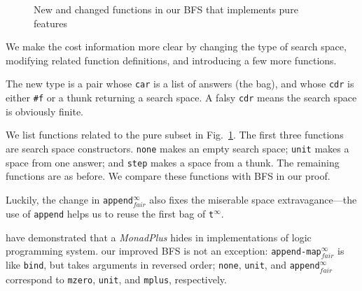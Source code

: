 \documentclass[format=acmlarge, review=true, authordraft=true]{acmart}
\newcommand{\BFS}[0]{BFS}
\newcommand{\BFSser}[0]{BFS}
\newcommand{\BFSimp}[0]{our improved BFS}
\begin{document}
\begin{figure}
		
	\caption{New and changed functions in our BFS that implements pure 
	features}
	\label{BFSimp}
\end{figure}


We make the cost information more clear by changing the type of search space, 
modifying related function definitions, and introducing a few more functions.

The new type is a pair whose \texttt{car} is a list of answers (the bag), and 
whose \texttt{cdr} is either \texttt{\#{}f} or a thunk returning a search 
space. A falsy \texttt{cdr} means the search space is obviously finite. 

We list functions related to the pure subset in Fig.~\ref{BFSimp}. The first 
three functions are search space constructors. \texttt{none} makes an empty 
search space; \texttt{unit} makes a space from one answer; and \texttt{step} 
makes a space from a thunk. The remaining functions are as before. We compare 
these functions with \BFSser{} in our proof. 

Luckily, the change in \texttt{append$^\infty_{fair}$} also fixes the miserable 
space extravagance---the use of \texttt{append} helps us to reuse the first bag 
of \texttt{t$^\infty$}.

\citet{kiselyov2005backtracking} have demonstrated that a \emph{MonadPlus} 
hides in implementations of logic programming system. \BFSimp{} is not an 
exception: \texttt{append-map$^\infty_{fair}$} is like \texttt{bind}, but takes 
arguments in reversed order; \texttt{none}, \texttt{unit}, and 
\texttt{append$^\infty_{fair}$} correspond to \texttt{mzero}, \texttt{unit}, and 
\texttt{mplus}, respectively.

\end{document}
